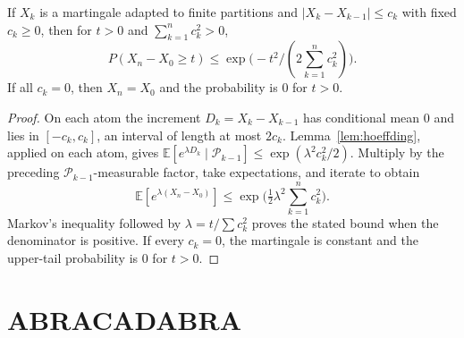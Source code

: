 \begin{theorem}[Azuma]\label{thm:azuma}
If $X_k$ is a martingale adapted to finite partitions and $|X_k-X_{k-1}|\le c_k$ with fixed $c_k\ge0$, then for $t>0$ and $\sum_{k=1}^n c_k^2>0$,
\[
P(X_n-X_0\ge t)\le\exp\bigl(-t^2/(2\sum_{k=1}^n c_k^2)\bigr).
\]
If all $c_k=0$, then $X_n=X_0$ and the probability is $0$ for $t>0$.
\end{theorem}
\begin{proof}
On each atom the increment $D_k=X_k-X_{k-1}$ has conditional mean $0$ and lies in $[-c_k,c_k]$, an interval of length at most $2c_k$. Lemma~\ref{lem:hoeffding}, applied on each atom, gives $\mathbb E[e^{\lambda D_k}\mid\mathcal P_{k-1}]\le\exp(\lambda^2c_k^2/2)$. Multiply by the preceding $\mathcal P_{k-1}$-measurable factor, take expectations, and iterate to obtain
\[
\mathbb E[e^{\lambda(X_n-X_0)}]\le \exp\bigl(\tfrac12\lambda^2\sum_{k=1}^n c_k^2\bigr).
\]
Markov's inequality followed by $\lambda=t/\sum c_k^2$ proves the stated bound when the denominator is positive. If every $c_k=0$, the martingale is constant and the upper-tail probability is $0$ for $t>0$.
\end{proof}

\section{ABRACADABRA}

